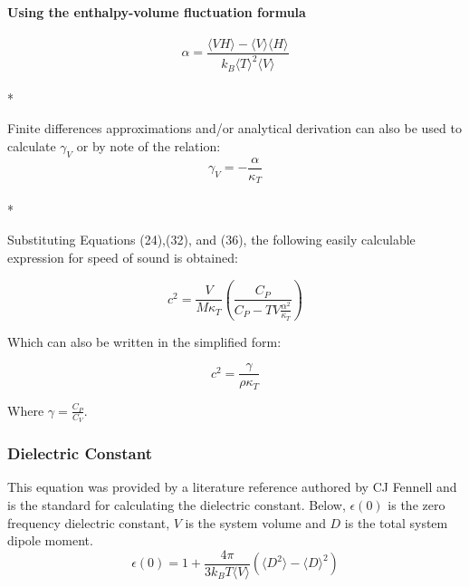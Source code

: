 \documentclass[9pt,bestpractices]{livecoms}
\begin{document}
\paragraph{Using the enthalpy-volume fluctuation formula}
\begin{equation}\alpha = \frac{\langle VH \rangle - \langle V \rangle \langle H \rangle}{k_B \langle T \rangle^2 \langle V \rangle}\end{equation}\\*

Finite differences approximations and/or analytical derivation can also be used to calculate $\gamma_V$ or by note of the relation:
\begin{equation}\gamma_V = - \frac{\alpha}{\kappa_T}\end{equation}\\*

Substituting Equations (24),(32), and (36), the following easily calculable expression for speed of sound is obtained:

\begin{equation} c^2=\frac{V}{M \kappa_T}\left(\frac{C_P}{C_P -TV\frac{\alpha^2}{\kappa_T}}\right)\end{equation}

Which can also be written in the simplified form:

\begin{equation} c^2= \frac{\gamma}{\rho \kappa_T} \end{equation}

Where $ \gamma=\frac{C_P}{C_V} $.


\subsubsection{Dielectric Constant}
This equation was provided by a literature reference authored by CJ Fennell\cite{dielec} and is the standard for calculating the dielectric constant. Below, $\epsilon(0)$ is the zero frequency dielectric constant, $V$ is the system volume and $D$ is the total system dipole moment. 
\begin{equation} \epsilon(0) = 1 + \frac{4 \pi}{3 k_B T \langle V \rangle}(\langle D^2 \rangle - \langle D \rangle^2) \end{equation}
\end{document}
